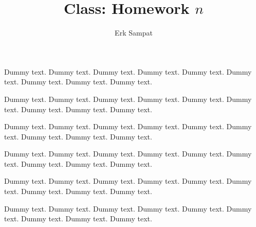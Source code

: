 \title{{\selectfont Class: } Homework $n$}
\author{Erk Sampat}



\maketitle
\prob
Dummy text. Dummy text. Dummy text. Dummy text. Dummy text. Dummy text. Dummy text. Dummy text. Dummy text.

Dummy text. Dummy text. Dummy text. Dummy text. Dummy text. Dummy text. Dummy text. Dummy text. Dummy text.
\begin{pp}
	Dummy text. Dummy text. Dummy text. Dummy text. Dummy text. Dummy text. Dummy text. Dummy text. Dummy text.
	
	Dummy text. Dummy text. Dummy text. Dummy text. Dummy text. Dummy text. Dummy text. Dummy text. Dummy text.
	\begin{spart}
		Dummy text. Dummy text. Dummy text. Dummy text. Dummy text. Dummy text. Dummy text. Dummy text. Dummy text.
		
		Dummy text. Dummy text. Dummy text. Dummy text. Dummy text. Dummy text. Dummy text. Dummy text. Dummy text.
	\end{spart}
\end{pp}
